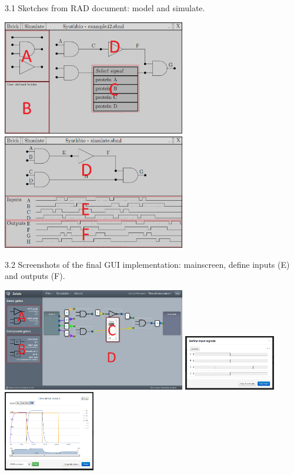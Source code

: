 \documentclass[a4paper]{article}
\begin{document}
\centerline{\small 3.1 Sketches from RAD document: model and simulate.}
\noindent \includegraphics[width=8cm]{pictures/gui_sketch1_marks.png} 
\includegraphics[width=8cm]{pictures/gui_sketch2_marks.png}\\

\centerline{\small 3.2 Screenshots of the final GUI implementation: mainscreen, define inputs (E) and outputs (F).}
\noindent \includegraphics[width=8cm]{pictures/gui_final1_marks.png} 
\includegraphics[width=4cm]{pictures/gui_final_inputselect.png}
\includegraphics[width=4cm]{pictures/gui_final_output.png}\\
\end{document}

